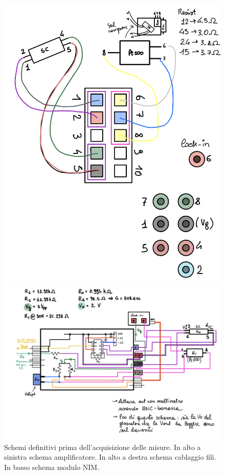 \documentclass[../main/main.tex]{subfiles}
\begin{document}
\begin{figure}[h!]
\begin{minipage}[]{0.5\linewidth}
\includegraphics[width=1\textwidth]{../lessons/image/16/cablaggio.png}
\end{minipage}
\vspace{1cm}
\begin{minipage}[]{1\linewidth}
\centering
\includegraphics[width=1\textwidth]{../lessons/image/16/nim.png}
\end{minipage}
\caption{\label{fig:16_1} Schemi definitivi prima dell'acquisizione delle misure. In alto a sinistra schema amplificatore. In alto a destra schema cablaggio fili. In basso schema modulo NIM.}
\end{figure}
\end{document}
